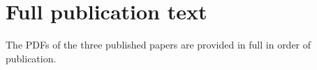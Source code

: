 
\chapter{Full publication text}
\label{Appx:Papers}

The PDFs of the three published papers are provided in full in order of publication.
